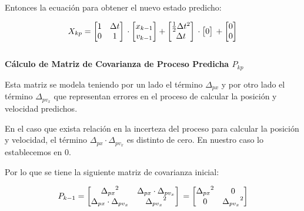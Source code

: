 Entonces la ecuación para obtener el nuevo estado predicho:

$$
X_{kp} = 
    \begin{bmatrix}
    1 & \Delta t  \\
    0 & 1         \\
    \end{bmatrix} \\
    \cdot \begin{bmatrix} x_{k-1} \\ v_{k-1} \\ \end{bmatrix}
    +
    \begin{bmatrix}
    \frac{1}{2} \Delta t^2 \\
    \Delta t               \\
    \end{bmatrix}          \\
    \cdot
    \begin{bmatrix} 0 \\ \end{bmatrix} \\
    +
    \begin{bmatrix} 0 \\ 0 \\ \end{bmatrix}
$$ \\

\textbf{Cálculo de Matriz de Covarianza de Proceso Predicha $P_{kp}$} \mbox{} \vspace{8pt}

Esta matriz se modela teniendo por un lado el término $\Delta_{px}$ y por otro lado el término $\Delta_{pv_x}$ que representan errores en el proceso de calcular la posición y velocidad predichos.

En el caso que exista relación en la incerteza del proceso para calcular la posición y velocidad, el término $\Delta_{px} \cdot \Delta_{pv_x}$ es distinto de cero. En nuestro caso lo establecemos en $0$.

Por lo que se tiene la siguiente matriz de covarianza inicial:

$$
P_{k-1} = \begin{bmatrix}
    {\Delta_{px}}^2 & \Delta_{px} \cdot \Delta_{pv_x} \\
    \Delta_{px} \cdot \Delta_{pv_x} & {\Delta_{pv_x}}^2 \\
    \end{bmatrix} \\
    = \begin{bmatrix}
    {\Delta_{px}}^2 & 0 \\
    0 & {\Delta_{pv_x}}^2 \\
    \end{bmatrix} 
$$

